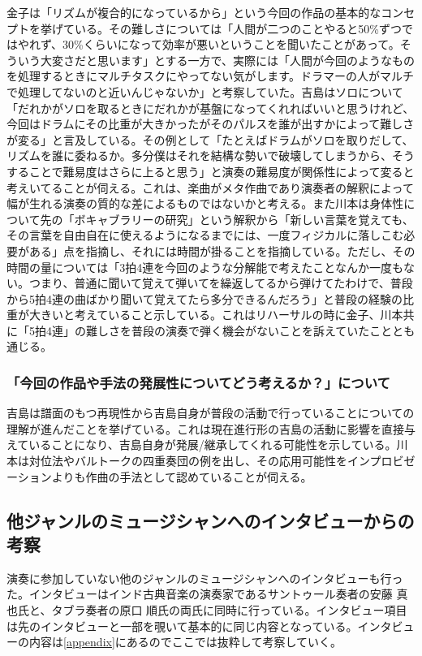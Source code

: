 \documentclass[uplatex,dvipdfmx]{ujarticle}
\begin{document}
金子は「リズムが複合的になっているから」という今回の作品の基本的なコンセプトを挙げている。その難しさについては「人間が二つのことやると50\%ずつではやれず、30\%くらいになって効率が悪いということを聞いたことがあって。そういう大変さだと思います」とする一方で、実際には「人間が今回のようなものを処理するときにマルチタスクにやってない気がします。ドラマーの人がマルチで処理してないのと近いんじゃないか」と考察していた。吉島はソロについて「だれかがソロを取るときにだれかが基盤になってくれればいいと思うけれど、今回はドラムにその比重が大きかったがそのパルスを誰が出すかによって難しさが変る」と言及している。その例として「たとえばドラムがソロを取りだして、リズムを誰に委ねるか。多分僕はそれを結構な勢いで破壊してしまうから、そうすることで難易度はさらに上ると思う」と演奏の難易度が関係性によって変ると考えいてることが伺える。これは、楽曲がメタ作曲であり演奏者の解釈によって幅が生れる演奏の質的な差によるものではないかと考える。また川本は身体性について先の「ボキャブラリーの研究」という解釈から「新しい言葉を覚えても、その言葉を自由自在に使えるようになるまでには、一度フィジカルに落しこむ必要がある」点を指摘し、それには時間が掛ることを指摘している。ただし、その時間の量については「3拍4連を今回のような分解能で考えたことなんか一度もない。つまり、普通に聞いて覚えて弾いてを繰返してるから弾けてたわけで、普段から5拍4連の曲ばかり聞いて覚えてたら多分できるんだろう」と普段の経験の比重が大きいと考えていること示している。これはリハーサルの時に金子、川本共に「5拍4連」の難しさを普段の演奏で弾く機会がないことを訴えていたこととも通じる。

\subsubsection{「今回の作品や手法の発展性についてどう考えるか？」について}

吉島は譜面のもつ再現性から吉島自身が普段の活動で行っていることについての理解が進んだことを挙げている。これは現在進行形の吉島の活動に影響を直接与えていることになり、吉島自身が発展/継承してくれる可能性を示している。川本は対位法やバルトークの四重奏団の例を出し、その応用可能性をインプロビゼーションよりも作曲の手法として認めていることが伺える。

\subsection{他ジャンルのミュージシャンへのインタビューからの考察}

演奏に参加していない他のジャンルのミュージシャンへのインタビューも行った。インタビューはインド古典音楽の演奏家であるサントゥール奏者の安藤 真也氏と、タブラ奏者の原口 順氏の両氏に同時に行っている。インタビュー項目は先のインタビューと一部を覗いて基本的に同じ内容となっている。インタビューの内容は\ref{appendix}にあるのでここでは抜粋して考察していく。
\end{document}

